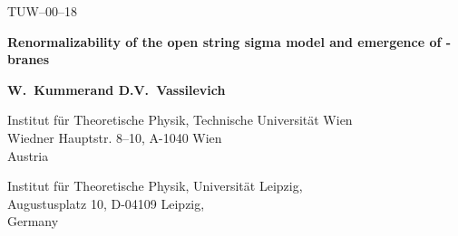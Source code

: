 \documentclass[a4paper,12pt]{article}
\begin{document}
\begin{titlepage} \renewcommand{\thefootnote}{\fnsymbol{footnote}}

\hfill{}TUW--00--18 \\


{\par\centering \vspace{1cm}\par}

{\par\centering \textbf{\large 
Renormalizability of the open 
string sigma model and emergence of \coordHE{}-branes
}\large \par}

{\par\centering \vspace{1.0cm} \vfill
\renewcommand{\baselinestretch}{1}\par}

{\par\centering \textbf{W.\ Kummer\coordHE{}\footnotemark[1] 
and D.V.\ Vassilevich\coordHE{}\footnotemark[2] \footnotemark[3]{}} 
\vspace{7ex}\par}

{\par\centering {}\coordHE{}Institut f\"{u}r Theoretische Physik, Technische
Universit\"{a}t Wien \\
 Wiedner Hauptstr. 8--10, A-1040 Wien \\
 Austria \vspace{2ex}\par}

{\par\centering {}\coordHE{}Institut f\"{u}r Theoretische Physik, Universit\"{a}t
Leipzig,\\
 Augustusplatz 10, D-04109 Leipzig,\\
 Germany\par}

{\par\centering {}  \par}

\vfill


\end{titlepage}
\end{document}
